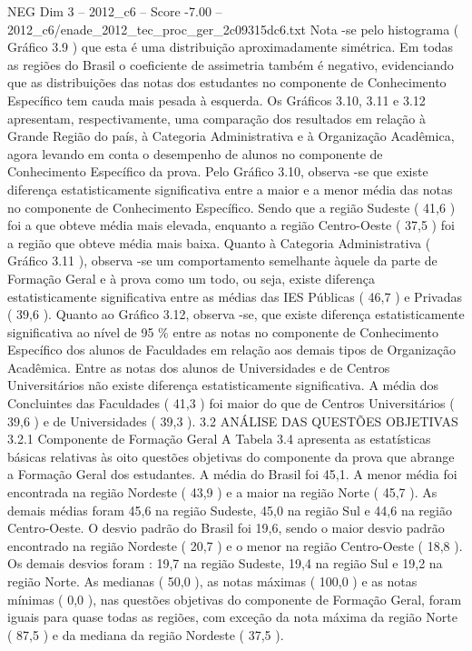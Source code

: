 \begin{textsample}{NEG Dim 3 – 2012\_c6 – Score -7.00 – 2012\_c6/enade\_2012\_tec\_proc\_ger\_2c09315dc6.txt}
Nota -se pelo histograma ( Gráfico 3.9 ) que esta é uma distribuição aproximadamente simétrica.
Em todas as regiões do Brasil o coeficiente de assimetria também é negativo, evidenciando que as distribuições das notas dos estudantes no componente de Conhecimento Específico tem cauda mais pesada à esquerda.
Os Gráficos 3.10, 3.11 e 3.12 apresentam, respectivamente, uma comparação dos resultados em relação à Grande Região do país, à Categoria Administrativa e à Organização Acadêmica, agora levando em conta o desempenho de alunos no componente de Conhecimento Específico da prova.
Pelo Gráfico 3.10, observa -se que existe diferença estatisticamente significativa entre a maior e a menor média das notas no componente de Conhecimento Específico.
Sendo que a região Sudeste ( 41,6 ) foi a que obteve média mais elevada, enquanto a região Centro-Oeste ( 37,5 ) foi a região que obteve média mais baixa.
Quanto à Categoria Administrativa ( Gráfico 3.11 ), observa -se um comportamento semelhante àquele da parte de Formação Geral e à prova como um todo, ou seja, existe diferença estatisticamente significativa entre as médias das IES Públicas ( 46,7 ) e Privadas ( 39,6 ).
Quanto ao Gráfico 3.12, observa -se, que existe diferença estatisticamente significativa ao nível de 95 \% entre as notas no componente de Conhecimento Específico dos alunos de Faculdades em relação aos demais tipos de Organização Acadêmica.
Entre as notas dos alunos de Universidades e de Centros Universitários não existe diferença estatisticamente significativa.
A média dos Concluintes das Faculdades ( 41,3 ) foi maior do que de Centros Universitários ( 39,6 ) e de Universidades ( 39,3 ). 3.2 ANÁLISE DAS QUESTÕES OBJETIVAS 3.2.1 Componente de Formação Geral A Tabela 3.4 apresenta as estatísticas básicas relativas às oito questões objetivas do componente da prova que abrange a Formação Geral dos estudantes.
A média do Brasil foi 45,1.
A menor média foi encontrada na região Nordeste ( 43,9 ) e a maior na região Norte ( 45,7 ).
As demais médias foram 45,6 na região Sudeste, 45,0 na região Sul e 44,6 na região Centro-Oeste.
O desvio padrão do Brasil foi 19,6, sendo o maior desvio padrão encontrado na região Nordeste ( 20,7 ) e o menor na região Centro-Oeste ( 18,8 ).
Os demais desvios foram : 19,7 na região Sudeste, 19,4 na região Sul e 19,2 na região Norte.
As medianas ( 50,0 ), as notas máximas ( 100,0 ) e as notas mínimas ( 0,0 ), nas questões objetivas do componente de Formação Geral, foram iguais para quase todas as regiões, com exceção da nota máxima da região Norte ( 87,5 ) e da mediana da região Nordeste ( 37,5 ).

\end{textsample}
